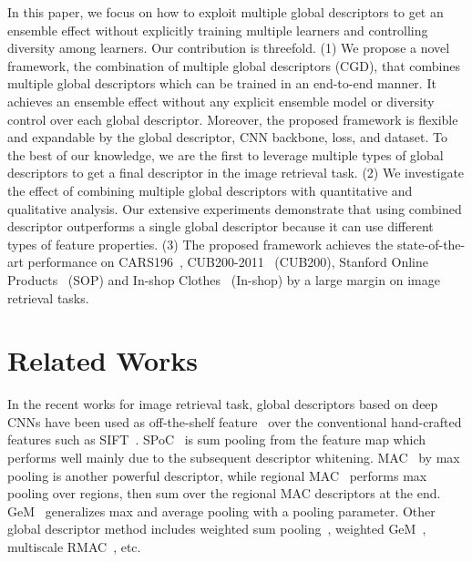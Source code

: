 \documentclass[10pt,twocolumn,letterpaper]{article}
\begin{document}
\begin{CJK}{UTF8}{mj}
In this paper, we focus on how to exploit multiple global descriptors to get an ensemble effect without explicitly training multiple learners and controlling diversity among learners.
Our contribution is threefold.
(1) We propose a novel framework, the combination of multiple global descriptors (CGD), that combines multiple global descriptors which can be trained in an end-to-end manner.
It achieves an ensemble effect without any explicit ensemble model or diversity control over each global descriptor.
Moreover, the proposed framework is flexible and expandable by the global descriptor, CNN backbone, loss, and dataset.
To the best of our knowledge, we are the first to leverage multiple types of global descriptors to get a final descriptor in the image retrieval task.
(2) We investigate the effect of combining multiple global descriptors with quantitative and qualitative analysis.
Our extensive experiments demonstrate that using combined descriptor outperforms a single global descriptor because it can use different types of feature properties.
(3) The proposed framework achieves the state-of-the-art performance on CARS196~\cite{krause20133d}, CUB200-2011~\cite{wah2011caltech} (CUB200), Stanford Online Products~\cite{oh2016deep} (SOP) and In-shop Clothes~\cite{liu2016deepfashion} (In-shop) by a large margin on image retrieval tasks.



\section{Related Works}

In the recent works for image retrieval task, global descriptors based on deep CNNs have been used as off-the-shelf feature~\cite{sharif2014cnn, Babenko_2015_ICCV} over the conventional hand-crafted features such as SIFT~\cite{lowe2004distinctive}.
SPoC~\cite{Babenko_2015_ICCV} is sum pooling from the feature map which performs well mainly due to the subsequent descriptor whitening.
MAC~\cite{tolias2015particular} by max pooling is another powerful descriptor, while regional MAC~\cite{tolias2015particular} performs max pooling over regions, then sum over the regional MAC descriptors at the end.
GeM~\cite{radenovic2018fine} generalizes max and average pooling with a pooling parameter.
Other global descriptor method includes weighted sum pooling~\cite{kalantidis2016cross}, weighted GeM~\cite{wu2018weighted},  multiscale RMAC~\cite{li2017ms}, etc.


\end{CJK}
\end{document}
